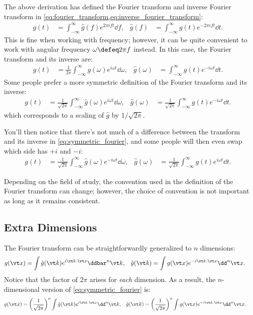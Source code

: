 \documentclass[
  a4paper,             %
  11pt,                %
  oneside,             %
  onecolumn,           %
  bibliography=totoc,  %
  final,               %
]{scrartcl}
\begin{document}
The above derivation has defined the Fourier transform and inverse Fourier
transform in \cref{eq:fourier_transform,eq:inverse_fourier_transform}:
\begin{align}
  g(t) &= \int_{-\infty}^{\infty} \hat g(f) e^{2\pi i f t} \dd f, &
  \hat g(f) &= \int_{-\infty}^{\infty} g(t) e^{-2\pi i f t} \dd t.
\end{align}
This is fine when working with frequency; however, it can be quite convenient to
work with angular frequency \(\omega \defeq 2\pi f\) instead.  In this case, the
Fourier transform and its inverse are:
\begin{align}
  g(t) &= \frac{1}{2\pi} \int_{-\infty}^{\infty} \hat g(\omega) e^{i \omega t} \dd \omega, &
  \hat g(\omega) &= \int_{-\infty}^{\infty} g(t) e^{-i \omega t} \dd t.
\end{align}
Some people prefer a more symmetric definition of the Fourier transform and its
inverse:
\begin{align}
  \label{eq:symmetric_fourier}
  g(t) &= \frac{1}{\sqrt{2\pi}} \int_{-\infty}^{\infty} \hat g(\omega) e^{i \omega t} \dd \omega, &
  \hat g(\omega) &= \frac{1}{\sqrt{2\pi}} \int_{-\infty}^{\infty} g(t) e^{-i \omega t} \dd t.
\end{align}
which corresponds to a scaling of \(\hat g\) by \(1 / \sqrt{2\pi}\).

You'll then notice that there's not much of a difference between the transform
and its inverse in \cref{eq:symmetric_fourier}, and some people will then even
swap which side has \(+i\) and \(-i\):
\begin{align}
  g(t) &= \frac{1}{\sqrt{2\pi}} \int_{-\infty}^{\infty} \hat g(\omega) e^{-i \omega t} \dd \omega, &
  \hat g(\omega) &= \frac{1}{\sqrt{2\pi}} \int_{-\infty}^{\infty} g(t) e^{i \omega t} \dd t.
\end{align}

Depending on the field of study, the convention used in the definition of the
Fourier transform can change; however, the choice of convention is not important
as long as it remains consistent.

\subsection{Extra Dimensions}
\label{subsec:extra_dimensions}

The Fourier transform can be straightforwardly generalized to \(n\) dimensions:
\begin{align}
  \label{eq:n-dim_fourier_transform}
  g(\vt x) &= \int \hat g(\vt k) e^{i \vt k \cdot \vt x} \ddbar^{n}{\vt k} , &
  \hat g(\vt k) &= \int g(\vt x) e^{-i \vt k \cdot \vt x} \dd^{n} \vt x.
\end{align}
Notice that the factor of \(2\pi\) arises for \emph{each} dimension.  As a
result, the \(n\)-dimensional version of \cref{eq:symmetric_fourier} is:
\begin{align}
  \label{eq:n-dim_fourier_transform}
  g(\vt x) &= \left( \frac{1}{\sqrt{2\pi}}\right)^{n} \int \hat g(\vt k) e^{i \vt k \cdot \vt x} \dd^{n}{\vt k} , &
  \hat g(\vt k) &= \left( \frac{1}{\sqrt{2\pi}}\right)^{n} \int g(\vt x) e^{-i \vt k \cdot \vt x} \dd^{n} \vt x.
\end{align}
\end{document}
